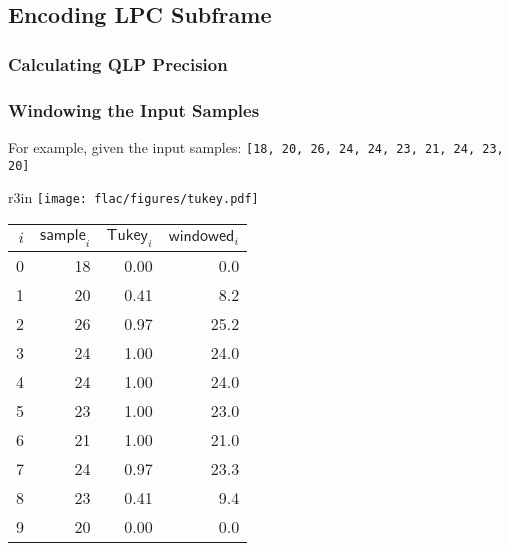 
\subsection{Encoding LPC Subframe}
\label{flac:encode_lpc_subframe}
{
  
}

\clearpage

\subsubsection{Calculating QLP Precision}
\label{flac:calculate_qlp_precision}
{
  
}

\subsubsection{Windowing the Input Samples}
\label{flac:window}
{
  
}

\par
For example, given the input samples: \texttt{[18, 20, 26, 24, 24, 23, 21, 24, 23, 20]}
\begin{wrapfigure}[5]{r}{3in}
\texttt{[image: flac/figures/tukey.pdf]}
\end{wrapfigure}
\begin{table}[h]
\begin{tabular}{r|r|r|r}
$i$ & $\textsf{sample}_i$ & $\textsf{Tukey}_i$ & $\textsf{windowed}_i$ \\
\hline
0 & 18 & 0.00 & 0.0 \\
1 & 20 & 0.41 & 8.2 \\
2 & 26 & 0.97 & 25.2 \\
3 & 24 & 1.00 & 24.0 \\
4 & 24 & 1.00 & 24.0 \\
5 & 23 & 1.00 & 23.0 \\
6 & 21 & 1.00 & 21.0 \\
7 & 24 & 0.97 & 23.3 \\
8 & 23 & 0.41 & 9.4 \\
9 & 20 & 0.00 & 0.0 \\
\end{tabular}
\end{table}

